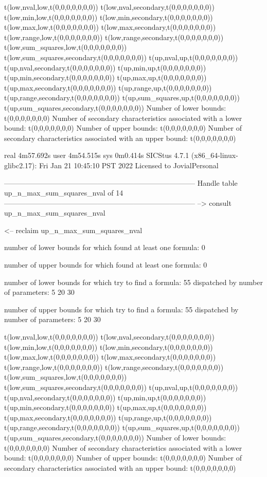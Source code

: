 t(low,nval,low,t(0,0,0,0,0,0,0))
t(low,nval,secondary,t(0,0,0,0,0,0,0))
t(low,min,low,t(0,0,0,0,0,0,0))
t(low,min,secondary,t(0,0,0,0,0,0,0))
t(low,max,low,t(0,0,0,0,0,0,0))
t(low,max,secondary,t(0,0,0,0,0,0,0))
t(low,range,low,t(0,0,0,0,0,0,0))
t(low,range,secondary,t(0,0,0,0,0,0,0))
t(low,sum_squares,low,t(0,0,0,0,0,0,0))
t(low,sum_squares,secondary,t(0,0,0,0,0,0,0))
t(up,nval,up,t(0,0,0,0,0,0,0))
t(up,nval,secondary,t(0,0,0,0,0,0,0))
t(up,min,up,t(0,0,0,0,0,0,0))
t(up,min,secondary,t(0,0,0,0,0,0,0))
t(up,max,up,t(0,0,0,0,0,0,0))
t(up,max,secondary,t(0,0,0,0,0,0,0))
t(up,range,up,t(0,0,0,0,0,0,0))
t(up,range,secondary,t(0,0,0,0,0,0,0))
t(up,sum_squares,up,t(0,0,0,0,0,0,0))
t(up,sum_squares,secondary,t(0,0,0,0,0,0,0))
Number of lower bounds:                                             t(0,0,0,0,0,0,0)
Number of secondary characteristics associated with a lower bound:  t(0,0,0,0,0,0,0)
Number of upper bounds:                                             t(0,0,0,0,0,0,0)
Number of secondary characteristics associated with an upper bound: t(0,0,0,0,0,0,0)

real	4m57.692s
user	4m54.515s
sys	0m0.414s
SICStus 4.7.1 (x86_64-linux-glibc2.17): Fri Jan 21 10:45:10 PST 2022
Licensed to JovialPersonal


--------------------------------------------------------------------------------
Handle table up_n_max_sum_squares_nval of 14
--------------------------------------------------------------------------------
--> consult up_n_max_sum_squares_nval

<-- reclaim up_n_max_sum_squares_nval

number of lower bounds for which found at least one formula: 0

number of upper bounds for which found at least one formula: 0

number of lower bounds for which try to find a formula: 55
dispatched by number of parameters: 5  20  30

number of upper bounds for which try to find a formula: 55
dispatched by number of parameters: 5  20  30

t(low,nval,low,t(0,0,0,0,0,0,0))
t(low,nval,secondary,t(0,0,0,0,0,0,0))
t(low,min,low,t(0,0,0,0,0,0,0))
t(low,min,secondary,t(0,0,0,0,0,0,0))
t(low,max,low,t(0,0,0,0,0,0,0))
t(low,max,secondary,t(0,0,0,0,0,0,0))
t(low,range,low,t(0,0,0,0,0,0,0))
t(low,range,secondary,t(0,0,0,0,0,0,0))
t(low,sum_squares,low,t(0,0,0,0,0,0,0))
t(low,sum_squares,secondary,t(0,0,0,0,0,0,0))
t(up,nval,up,t(0,0,0,0,0,0,0))
t(up,nval,secondary,t(0,0,0,0,0,0,0))
t(up,min,up,t(0,0,0,0,0,0,0))
t(up,min,secondary,t(0,0,0,0,0,0,0))
t(up,max,up,t(0,0,0,0,0,0,0))
t(up,max,secondary,t(0,0,0,0,0,0,0))
t(up,range,up,t(0,0,0,0,0,0,0))
t(up,range,secondary,t(0,0,0,0,0,0,0))
t(up,sum_squares,up,t(0,0,0,0,0,0,0))
t(up,sum_squares,secondary,t(0,0,0,0,0,0,0))
Number of lower bounds:                                             t(0,0,0,0,0,0,0)
Number of secondary characteristics associated with a lower bound:  t(0,0,0,0,0,0,0)
Number of upper bounds:                                             t(0,0,0,0,0,0,0)
Number of secondary characteristics associated with an upper bound: t(0,0,0,0,0,0,0)

